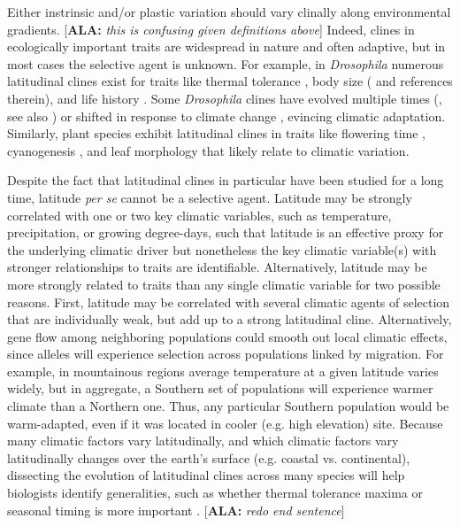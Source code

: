 \documentclass[11pt, oneside]{article}
\newcommand{\ala}[1]{{ \color{blue} [{\bf{ALA:}} {\em#1}]}} %
\begin{document}
Either instrinsic and/or plastic variation should vary clinally along environmental gradients.\ala{this is confusing given definitions above} Indeed, clines in ecologically important traits are widespread in nature \citep{Endler_1977} and often adaptive, but in most cases the selective agent is unknown. For example, in \textit{Drosophila} numerous latitudinal clines exist for traits like thermal tolerance \citep{Hoffmann_etal_2002}, body size (\cite{Coyne_Beecham_1987} and references therein), and life history \citep{Schmidt_etal_2005}. Some \textit{Drosophila} clines have evolved multiple times (\cite{Oakeshott_etal_1982, Huey_etal_2000}, see also \cite{Bradshaw_Holzapfel_2001}) or shifted in response to climate change \citep{Umina_etal_2005}, evincing climatic adaptation. Similarly, plant species exhibit latitudinal clines in traits like flowering time \citep{Stinchcombe_etal_2004}, cyanogenesis \citep{Kooyers_Olsen_2012}, and leaf morphology \citep{Hopkins_etal_2008} that likely relate to climatic variation. 

Despite the fact that latitudinal clines in particular have been studied for a long time, latitude \textit{per se} cannot be a selective agent. Latitude may be strongly correlated with one or two key climatic variables, such as temperature, precipitation, or growing degree-days, such that latitude is an effective proxy for the underlying climatic driver but nonetheless the key climatic variable(s) with stronger relationships to traits are identifiable. Alternatively, latitude may be more strongly related to traits than any single climatic variable for two possible reasons. First, latitude may be correlated with several climatic agents of selection that are individually weak, but add up to a strong latitudinal cline. Alternatively, gene flow among neighboring populations could smooth out local climatic effects, since alleles will experience selection across populations linked by migration. For example, in mountainous regions average temperature at a given latitude varies widely, but in aggregate, a Southern set of populations will experience warmer climate than a Northern one. Thus, any particular Southern population would be warm-adapted, even if it was located in cooler (e.g. high elevation) site. Because many climatic factors vary latitudinally, and which climatic factors vary latitudinally changes over the earth's surface (e.g. coastal vs. continental), dissecting the evolution of latitudinal clines across many species will help biologists identify generalities, such as whether thermal tolerance maxima or seasonal timing is more important \citep{Bradshaw_Holzapfel_2008}. \ala{redo end sentence}
\end{document}
